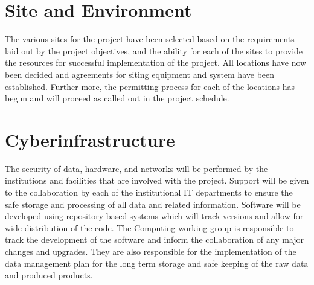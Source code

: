 



\section{Site and Environment}

The various sites for the project have been selected based on the requirements laid out by the project objectives, and the ability for each of the sites to provide the resources for successful implementation of the project.  All locations have now been decided and agreements for siting equipment and system have been established.  Further more, the permitting process for each of the locations has begun and will proceed as called out in the project schedule.  




\section{Cyberinfrastructure}

The security of data, hardware, and networks will be performed by the institutions and facilities that are involved with the project.  Support will be given to the collaboration by each of the institutional IT departments to ensure the safe storage and processing of all data and related information.  Software will be developed using repository-based systems which will track versions and allow for wide distribution of the code.  The Computing working group is responsible to track the development of the software and inform the collaboration of any major changes and upgrades.  They are also responsible for the implementation of the data management plan for the long term storage and safe keeping of the raw data and produced products.  


